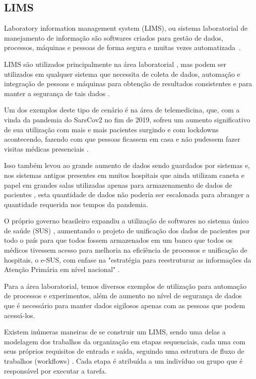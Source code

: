 \subsection{LIMS}


Laboratory information management system (LIMS), ou sistema laboratorial de manejamento de informação são softwares criados para gestão de dados, processos, máquinas e pessoas de forma segura e muitas vezes automatizada~\cite{Stafford1998LIMS:Technology}.


LIMS são utilizados principalmente na área laboratorial \R, mas podem ser utilizados em qualquer sistema que necessita de coleta de dados, automação e integração de pessoas e máquinas para obtenção de resultados consistentes e para manter a segurança de tais dados \R.

Um dos exemplos deste tipo de cenário é na área de telemedicina, que, com a vinda da pandemia do SarsCov2 no fim de 2019, sofreu um aumento significativo de sua utilização com mais e mais pacientes surgindo e com lockdowns acontecendo, fazendo com que pessoas ficassem em casa e não pudessem fazer visitas médicas presenciais \R.

Isso também levou ao grande aumento de dados sendo guardados por sistemas e, nos sistemas antigos presentes em muitos hospitais que ainda utilizam caneta e papel em grandes salas utilizadas apenas para armazenamento de dados de pacientes \R, esta quantidade de dados não poderia ser escalonada para abranger a quantidade requerida nos tempos da pandemia.


O próprio governo brasileiro expandiu a utilização de softwares no sistema único de saúde (SUS) \R, aumentando o projeto de unificação dos dados de pacientes por todo o país para que todos fossem armazenados em um banco que todos os médicos tivessem acesso para melhoria na eficiência de processos e unificação de hospitais, o  e-SUS, com enfase na "estratégia para reestruturar as informações da Atenção Primária em nível nacional" \R.

Para a área laboratorial, temos diversos exemplos de utilização para automação de processos e experimentos, além de aumento no nível de segurança de dados que é necessário para manter dados sigilosos apenas com as pessoas que podem acessá-los. \NO

Existem inúmeras maneiras de se construir um LIMS, sendo uma delas a modelagem dos trabalhos da organização em etapas sequenciais, cada uma com seus próprios requisitos de entrada e saída, seguindo uma estrutura de fluxo de trabalhos (workflows) \R. Cada etapa é atribuída a um indivíduo ou grupo que é responsável por executar a tarefa.

